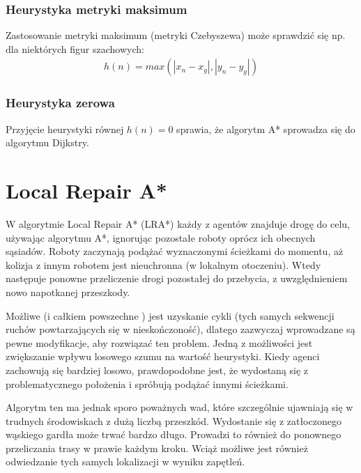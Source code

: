\subsubsection{Heurystyka metryki maksimum}
Zastosowanie metryki maksimum (metryki Czebyszewa) może sprawdzić się np. dla niektórych figur szachowych:
\begin{gather}
 	h(n) = max(|x_n - x_g|, |y_n - y_g|)
 	\label{eq_astar_heu_czeb} 
\end{gather}


\subsubsection{Heurystyka zerowa}
Przyjęcie heurystyki równej $h(n) = 0$ sprawia, że algorytm A* sprowadza się do algorytmu Dijkstry.

\section{Local Repair A*}
\label{ch:lra}
W algorytmie Local Repair A* (LRA*) każdy z agentów znajduje drogę do celu, używając algorytmu A*, ignorując pozostałe roboty oprócz ich obecnych sąsiadów. Roboty zaczynają podążać wyznaczonymi ścieżkami do momentu, aż kolizja z innym robotem jest nieuchronna (w lokalnym otoczeniu). Wtedy następuje ponowne przeliczenie drogi pozostałej do przebycia, z uwzględnieniem nowo napotkanej przeszkody.

Możliwe (i całkiem powszechne \cite{cooppath}) jest uzyskanie cykli (tych samych sekwencji ruchów powtarzających się w nieskończoność), dlatego zazwyczaj wprowadzane są pewne modyfikacje, aby rozwiązać ten problem. Jedną z możliwości jest zwiększanie wpływu losowego szumu na wartość heurystyki. Kiedy agenci zachowują się bardziej losowo, prawdopodobne jest, że wydostaną się z problematycznego położenia i spróbują podążać innymi ścieżkami.

Algorytm ten ma jednak sporo poważnych wad, które szczególnie ujawniają się w trudnych środowiskach z dużą liczbą przeszkód. Wydostanie się z zatłoczonego wąskiego gardła może trwać bardzo długo. Prowadzi to również do ponownego przeliczania trasy w prawie każdym kroku. Wciąż możliwe jest również odwiedzanie tych samych lokalizacji w wyniku zapętleń.

